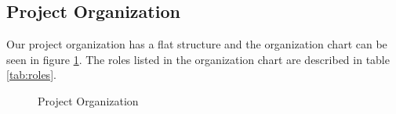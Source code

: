 \subsection{Project Organization}
Our project organization has a flat structure and the organization chart can be seen in figure \ref{fig:orgchart}. The roles listed in the organization chart are described in table \ref{tab:roles}.

\begin{figure}[htb]
	\noindent{}
	\caption{Project Organization\label{fig:orgchart}}
\end{figure}

